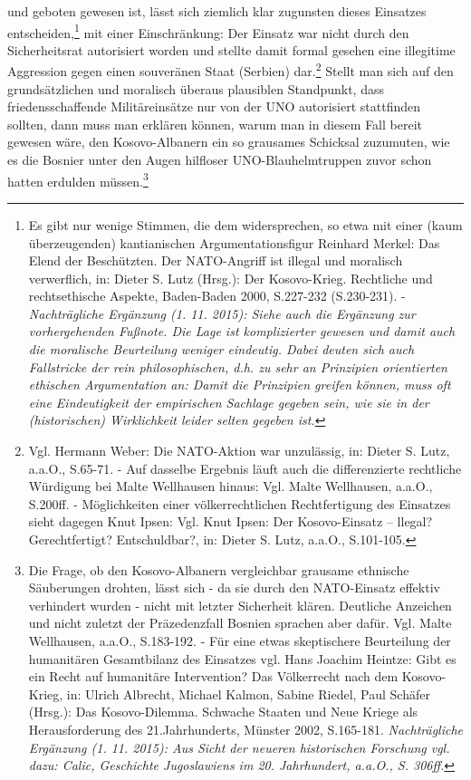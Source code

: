 \documentclass[12pt,a4paper,ngerman]{article}
\begin{document}
und geboten gewesen ist, lässt sich ziemlich klar zugunsten dieses
Einsatzes entscheiden,\footnote{Es gibt nur wenige Stimmen, die dem
  widersprechen, so etwa mit einer (kaum überzeugenden) kantianischen
  Argumentationsfigur Reinhard Merkel: Das Elend der Beschützten. Der
  NATO-Angriff ist illegal und moralisch verwerflich, in: Dieter
  S. Lutz (Hrsg.): Der Kosovo-Krieg.  Rechtliche und rechtsethische
  Aspekte, Baden-Baden 2000, S.227-232 (S.230-231). - {\em
    Nachträgliche Ergänzung (1. 11. 2015): Siehe auch die Ergänzung
    zur vorhergehenden Fußnote. Die Lage ist komplizierter gewesen und
    damit auch die moralische Beurteilung weniger eindeutig. Dabei
    deuten sich auch Fallstricke der rein philosophischen, d.h. zu
    sehr an Prinzipien orientierten ethischen Argumentation an: Damit
    die Prinzipien greifen können, muss oft eine Eindeutigkeit der
    empirischen Sachlage gegeben sein, wie sie in der (historischen)
    Wirklichkeit leider selten gegeben ist.}}  mit einer
Einschränkung: Der Einsatz war nicht durch den Sicherheitsrat
autorisiert worden und stellte damit formal gesehen eine illegitime
Aggression gegen einen souveränen Staat (Serbien)
dar.\footnote{Vgl. Hermann Weber: Die NATO-Aktion war unzulässig, in:
  Dieter S. Lutz, a.a.O., S.65-71. - Auf dasselbe Ergebnis läuft auch
  die differenzierte rechtliche Würdigung bei Malte Wellhausen hinaus:
  Vgl. Malte Wellhausen, a.a.O., S.200ff. - Möglichkeiten einer
  völkerrechtlichen Rechtfertigung des Einsatzes sieht dagegen Knut
  Ipsen: Vgl. Knut Ipsen: Der Kosovo-Einsatz -- llegal?
  Gerechtfertigt? Entschuldbar?, in: Dieter S. Lutz, a.a.O.,
  S.101-105.} Stellt man sich auf den grundsätzlichen und moralisch
überaus plausiblen Standpunkt, dass friedensschaffende Militäreinsätze
nur von der UNO autorisiert stattfinden sollten, dann muss man
erklären können, warum man in diesem Fall bereit gewesen wäre, den
Kosovo-Albanern ein so grausames Schicksal zuzumuten, wie es die
Bosnier unter den Augen hilfloser UNO-Blauhelmtruppen zuvor schon
hatten erdulden müssen.\footnote{Die Frage, ob den Kosovo-Albanern
  vergleichbar grausame ethnische Säuberungen drohten, lässt sich - da
  sie durch den NATO-Einsatz effektiv verhindert wurden - nicht mit
  letzter Sicherheit klären.  Deutliche Anzeichen und nicht zuletzt
  der Präzedenzfall Bosnien sprachen aber dafür. Vgl. Malte
  Wellhausen, a.a.O., S.183-192. - Für eine etwas skeptischere
  Beurteilung der humanitären Gesamtbilanz des Einsatzes vgl. Hans
  Joachim Heintze: Gibt es ein Recht auf humanitäre Intervention? Das
  Völkerrecht nach dem Kosovo-Krieg, in: Ulrich Albrecht, Michael
  Kalmon, Sabine Riedel, Paul Schäfer (Hrsg.): Das Kosovo-Dilemma.
  Schwache Staaten und Neue Kriege als Herausforderung des
  21.Jahrhunderts, Münster 2002, S.165-181. {\em Nachträgliche
    Ergänzung (1. 11. 2015): Aus Sicht der neueren historischen
    Forschung vgl. dazu: Calic, Geschichte Jugoslawiens im
    20. Jahrhundert, a.a.O., S. 306ff.}}
\end{document}
